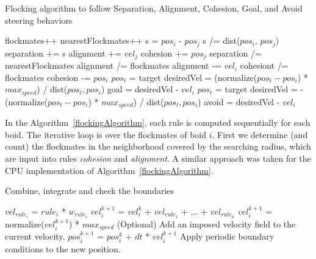 \begin{algorithm}
\caption{Flocking algorithm to follow Separation, Alignment, Cohesion, Goal, and Avoid steering behaviors}
\label{flockingAlgorithm}
\begin{algorithmic}
	\STATE flockmates++
				\STATE nearestFlockmates++
				\STATE s = $pos_i$ - $pos_j$ 
				\STATE s /= dist($pos_i$, $pos_j$) 
				\STATE separation += s
			\ENDIF
		\ENDIF
			\STATE alignment += $vel_j$
		\ENDIF
			\STATE cohesion += $pos_j$
		\ENDIF
	\ENDIF
\ENDFOR
{}
	\STATE separation /= nearestFlockmates
\ENDIF
{}
	\STATE alignment /=  flockmates
	\STATE alignment -= $vel_i$
\ENDIF
{}
	\STATE cohesiont /=  flockmates
	\STATE cohesion -= $pos_i$
\ENDIF
{}
	\STATE $pos_t$ = target
	\STATE desiredVel = (normalize($pos_t - pos_i$) * $max_{speed}$) / dist($pos_t, pos_i$) 
	\STATE goal = desiredVel - $vel_i$
\ENDIF
{}
	\STATE $pos_t$ = target
	\STATE desiredVel = -(normalize($pos_t - pos_i$) * $max_{speed}$) / dist($pos_t, pos_i$) 
	\STATE avoid = desiredVel - $vel_i$
\ENDIF

\end{algorithmic}
\end{algorithm}

In the Algorithm~\ref{flockingAlgorithm}, each rule is computed sequentially for each boid. The iterative loop is over the flockmates of boid $i$. First we determine (and count) the flockmates in the neighborhood covered by the searching radius, which are input into rules \textit{cohesion} and \textit{alignment}. A similar approach was taken for the CPU implementation of Algorithm~\ref{flockingAlgorithm}.

\begin{algorithm}
\caption{Combine, integrate and check the boundaries}
\label{combineAlgorithm}
\begin{algorithmic}
\STATE $vel_{rule_i}$  = $rule_i$ * $w_{rule_i}$ 
\STATE $vel_i^{k+1}$ = $vel_i^k$ + $vel_{rule_1}$ + ... + $vel_{rule_n}$
	\STATE $vel_i^{k+1}$ = normalize($vel_i^{k+1}$) * $max_{speed}$
\ENDIF  
\STATE (Optional) Add an imposed velocity field to the current velocity.
\STATE $pos_i^{k+1}$ = $pos_i^{k}$ + $dt$ * $vel_i^{k+1}$
\STATE Apply periodic boundary conditions to the new position.
\end{algorithmic}
\end{algorithm}

